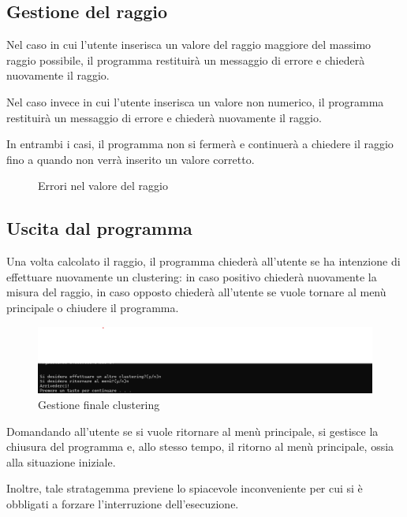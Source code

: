 \subsection{Gestione del raggio}

Nel caso in cui l'utente inserisca un valore del raggio maggiore del massimo raggio possibile, il programma restituirà un messaggio di errore e chiederà nuovamente il raggio.

Nel caso invece in cui l'utente inserisca un valore non numerico, il programma restituirà un messaggio di errore e chiederà nuovamente il raggio.

In entrambi i casi, il programma non si fermerà e continuerà a chiedere il raggio fino a quando non verrà inserito un valore corretto.

\begin{figure}[h!]
    \centering
    \hfill
    \caption{Errori nel valore del raggio}
\end{figure}

\subsection{Uscita dal programma}
Una volta calcolato il raggio, il programma chiederà all'utente se ha intenzione di effettuare nuovamente un clustering: in caso positivo chiederà nuovamente la misura del raggio, in caso opposto chiederà all'utente se vuole tornare al menù principale o chiudere il programma. 


\begin{figure}[h]
    \centering
    \includegraphics[width = .5\textwidth]{images/richeista continuazione.png}
    \caption{Gestione finale clustering}
\end{figure}

Domandando all'utente se si vuole ritornare al menù principale, si gestisce la chiusura del programma e, allo stesso tempo, il ritorno al menù principale, ossia alla situazione iniziale. 

Inoltre, tale stratagemma previene lo spiacevole inconveniente per cui si è obbligati a forzare l'interruzione dell'esecuzione.

